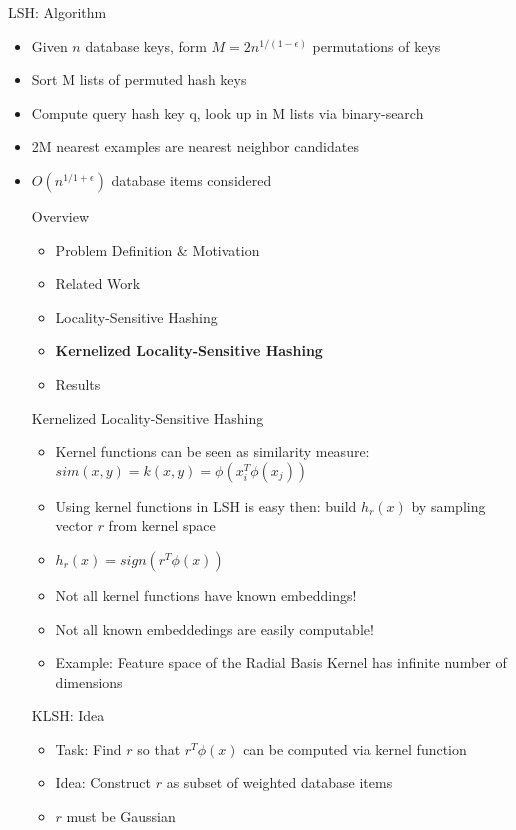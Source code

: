 \documentclass[12pt,a4paper]{beamer}
\begin{document}
\begin{frame}{LSH: Algorithm}
\begin{itemize}
\item Given $n$ database keys, form $M=2n^{1/(1-\epsilon)}$ permutations of keys
\item Sort M lists of permuted hash keys
\item Compute query hash key q, look up in M lists via binary-search
\item 2M nearest examples are nearest neighbor candidates
\item $O(n^{1/1+\epsilon})$ database items considered

\begin{frame}{Overview}
\begin{itemize}
\item Problem Definition & Motivation
\item Related Work
\item Locality-Sensitive Hashing
\item \textbf{Kernelized Locality-Sensitive Hashing}
\item Results
\end{itemize}
\end{frame}

\begin{frame}{Kernelized Locality-Sensitive Hashing}
\begin{itemize}
\item Kernel functions can be seen as similarity measure: $sim(x,y) = k(x,y) = \phi(x_{i}^{T}\phi(x_{j})) $
\item Using kernel functions in LSH is easy then: build $h_r(x)$ by sampling vector $r$ from kernel space
\item $h_r(x)=sign(r^T\phi(x))$
\item Not all kernel functions have known embeddings! \cite{klsh}
\item Not all known embeddedings are easily computable!
\item Example: Feature space of the Radial Basis Kernel has infinite number of dimensions
\end{itemize}
\end{frame}

\begin{frame}{KLSH: Idea}
\begin{itemize}
\item Task: Find $r$ so that $r^T\phi(x)$ can be computed via kernel function
\item Idea: Construct $r$ as subset of weighted database items
\item $r$ must be Gaussian
\end{itemize}
\end{frame}


\end{itemize}
\end{frame}
\end{document}
